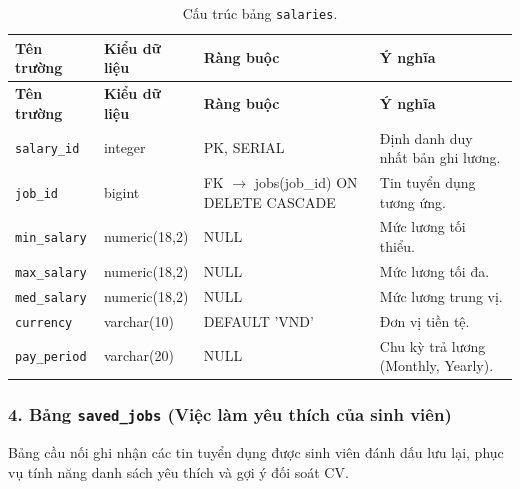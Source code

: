 \begin{footnotesize}\begin{longtable}{|L{3.5cm}|L{2.0cm}|L{3.0cm}|L{5.5cm}|}
\caption{Cấu trúc bảng \texttt{salaries}.}
\label{tab:salaries} \\
\hline
\textbf{Tên trường} & \textbf{Kiểu dữ liệu} & \textbf{Ràng buộc} & \textbf{Ý nghĩa} \\
\hline
\endfirsthead
\hline
\textbf{Tên trường} & \textbf{Kiểu dữ liệu} & \textbf{Ràng buộc} & \textbf{Ý nghĩa} \\
\hline
\endhead
\texttt{salary\_id} & integer & PK, SERIAL & Định danh duy nhất bản ghi lương. \\
\hline
\texttt{job\_id} & bigint & FK $\rightarrow$ jobs(job\_id) ON DELETE CASCADE & Tin tuyển dụng tương ứng. \\
\hline
\texttt{min\_salary} & numeric(18,2) & NULL & Mức lương tối thiểu. \\
\hline
\texttt{max\_salary} & numeric(18,2) & NULL & Mức lương tối đa. \\
\hline
\texttt{med\_salary} & numeric(18,2) & NULL & Mức lương trung vị. \\
\hline
\texttt{currency} & varchar(10) & DEFAULT 'VND' & Đơn vị tiền tệ. \\
\hline
\texttt{pay\_period} & varchar(20) & NULL & Chu kỳ trả lương (Monthly, Yearly). \\
\hline
\end{longtable}
\end{footnotesize}

\subsubsection*{4. Bảng \texttt{saved\_jobs} (Việc làm yêu thích của sinh viên)}

Bảng cầu nối ghi nhận các tin tuyển dụng được sinh viên đánh dấu lưu lại, phục vụ tính năng danh sách yêu thích và gợi ý đối soát CV.


